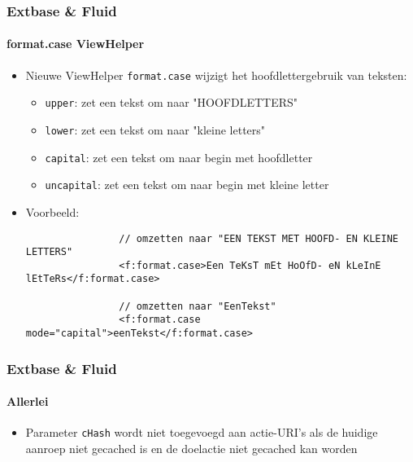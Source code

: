 
\begin{frame}[fragile]
	\frametitle{Extbase \& Fluid}
	\framesubtitle{format.case ViewHelper}

	\begin{itemize}

		\item Nieuwe ViewHelper \texttt{format.case} wijzigt het hoofdlettergebruik van teksten:
			\begin{itemize}
				\item \texttt{upper}: zet een tekst om naar "HOOFDLETTERS"
				\item \texttt{lower}: zet een tekst om naar "kleine letters"
				\item \texttt{capital}: zet een tekst om naar begin met hoofdletter
				\item \texttt{uncapital}: zet een tekst om naar begin met kleine letter
			\end{itemize}

		\item Voorbeeld:

			\begin{lstlisting}
				// omzetten naar "EEN TEKST MET HOOFD- EN KLEINE LETTERS"
				<f:format.case>Een TeKsT mEt HoOfD- eN kLeInE lEtTeRs</f:format.case>

				// omzetten naar "EenTekst"
				<f:format.case mode="capital">eenTekst</f:format.case>
			\end{lstlisting}

	\end{itemize}

\end{frame}


\begin{frame}[fragile]
	\frametitle{Extbase \& Fluid}
	\framesubtitle{Allerlei}

	\begin{itemize}

		\item Parameter \texttt{cHash} wordt niet toegevoegd aan actie-URI's als de huidige
			aanroep niet gecached is en de doelactie niet gecached kan worden

	\end{itemize}

\end{frame}
